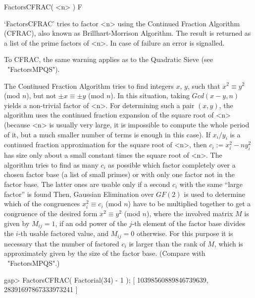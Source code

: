 
\>FactorsCFRAC( <n> ) F

`FactorsCFRAC' tries to factor <n> using the Continued Fraction
Algorithm (CFRAC), also known as Brillhart-Morrison Algorithm. 
The result is returned as a list of the prime factors of <n>.
In case of failure an error is signalled.

To CFRAC, the same warning applies 
as to the Quadratic Sieve (see ~"FactorsMPQS").

The Continued Fraction Algorithm tries to find integers $x$, $y$,
such that $x^2 \equiv y^2$ (mod $n$), but not $\pm x \equiv \pm y$
(mod $n$). In this situation, taking $Gcd(x - y,n)$ yields a 
non-trivial factor of <n>. For determining such a pair $(x,y)$, 
the algorithm uses the continued fraction expansion of the square root
of <n> (because <n> is usually very large, it is impossible to compute
the whole period of it, but a much smaller number of terms is enough
in this case). If $x_i/y_i$ is a
continued fraction approximation for the square root of <n>,
then $c_i := x_i^2 - ny_i^2$ has size only about a small constant times
the square root of <n>.
The algorithm tries to find as many $c_i$ as possible which factor 
completely over a chosen
factor base 
(a list of small primes) or with only one factor not in the factor base.
The latter ones are usable only if a second $c_i$ with the same
``large factor'' is found
Then,
Gaussian Elimination over $GF(2)$ 
is used to determine which of the congruences $x_i^2 \equiv c_i$
(mod $n$) have to be multiplied together to get a congruence
of the desired form  $x^2 \equiv y^2$ (mod $n$), where the involved
matrix $M$ is given by $M_{ij} = 1$, if an odd power of the $j$-th
element of the factor base divides the $i$-th usable factored
value, and $M_{ij} = 0$ otherwise.
For this purpose it is necessary that the number of factored 
$c_i$ is larger than the rank of $M$, which is approximately given by
the size of the factor base.
(Compare with ~"FactorsMPQS".)

\beginexample
gap> FactorsCFRAC( Factorial(34) - 1 );
[ 10398560889846739639, 28391697867333973241 ]
\endexample


